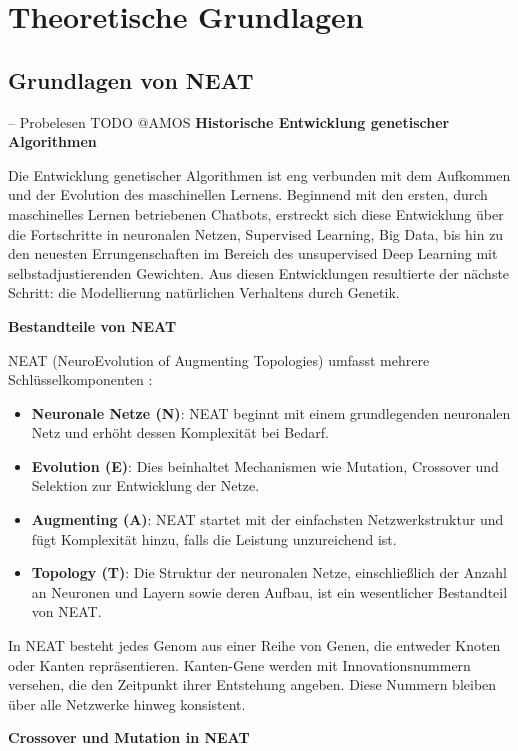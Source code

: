 \chapter{Theoretische Grundlagen}
\label{chapter:2}

\section{Grundlagen von NEAT}
-- Probelesen TODO @AMOS
\textbf{Historische Entwicklung genetischer Algorithmen}

Die Entwicklung genetischer Algorithmen ist eng verbunden mit dem Aufkommen und der Evolution des maschinellen Lernens. Beginnend mit den ersten, durch maschinelles Lernen betriebenen Chatbots, erstreckt sich diese Entwicklung über die Fortschritte in neuronalen Netzen, Supervised Learning, Big Data, bis hin zu den neuesten Errungenschaften im Bereich des unsupervised Deep Learning mit selbstadjustierenden Gewichten. Aus diesen Entwicklungen resultierte der nächste Schritt: die Modellierung natürlichen Verhaltens durch Genetik.

\textbf{Bestandteile von NEAT}

NEAT (NeuroEvolution of Augmenting Topologies) umfasst mehrere Schlüsselkomponenten \cite{NEAT}:

\begin{itemize}
	\item \textbf{Neuronale Netze (N)}: NEAT beginnt mit einem grundlegenden neuronalen Netz und erhöht dessen Komplexität bei Bedarf.
	\item \textbf{Evolution (E)}: Dies beinhaltet Mechanismen wie Mutation, Crossover und Selektion zur Entwicklung der Netze.
	\item \textbf{Augmenting (A)}: NEAT startet mit der einfachsten Netzwerkstruktur und fügt Komplexität hinzu, falls die Leistung unzureichend ist.
	\item \textbf{Topology (T)}: Die Struktur der neuronalen Netze, einschließlich der Anzahl an Neuronen und Layern sowie deren Aufbau, ist ein wesentlicher Bestandteil von NEAT.
\end{itemize}

In NEAT besteht jedes Genom aus einer Reihe von Genen, die entweder Knoten oder Kanten repräsentieren. Kanten-Gene werden mit Innovationsnummern versehen, die den Zeitpunkt ihrer Entstehung angeben. Diese Nummern bleiben über alle Netzwerke hinweg konsistent.

\textbf{Crossover und Mutation in NEAT}

